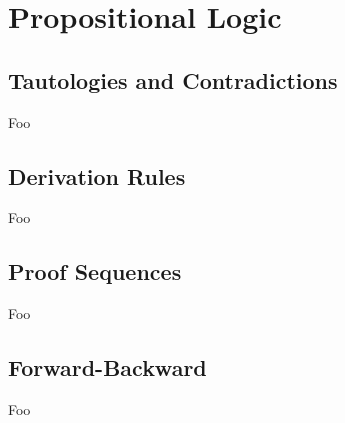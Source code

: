 \section{Propositional Logic}

\subsection{Tautologies and Contradictions}

Foo

\subsection{Derivation Rules}

Foo

\subsection{Proof Sequences}

Foo

\subsection{Forward-Backward}

Foo

